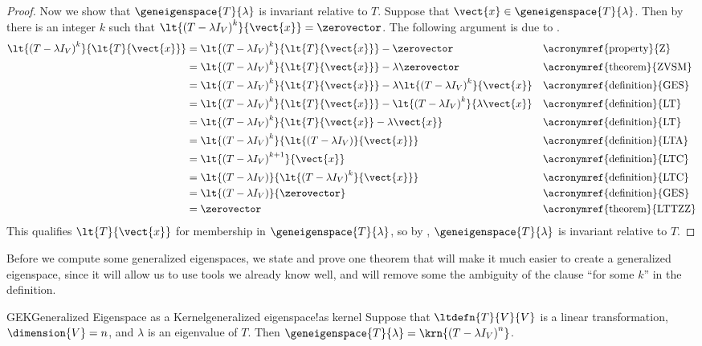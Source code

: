 \begin{proof}
%
Now we show that $\geneigenspace{T}{\lambda}$ is invariant relative to $T$.  Suppose that $\vect{x}\in\geneigenspace{T}{\lambda}$.  Then by  there is an integer $k$ such that $\lt{\left(T-\lambda I_V\right)^k}{\vect{x}}=\zerovector$.  The following argument is due to \zoltantoth.
%
\begin{align*}
\lt{\left(T-\lambda I_V\right)^k}{\lt{T}{\vect{x}}}
%
&=\lt{\left(T-\lambda I_V\right)^k}{\lt{T}{\vect{x}}} - \zerovector
&&\text{\acronymref{property}{Z}}\\
%
&=\lt{\left(T-\lambda I_V\right)^k}{\lt{T}{\vect{x}}} - \lambda\zerovector
&&\text{\acronymref{theorem}{ZVSM}}\\
%
&=\lt{\left(T-\lambda I_V\right)^k}{\lt{T}{\vect{x}}} 
- \lambda\lt{\left(T-\lambda I_V\right)^k}{\vect{x}}
&&\text{\acronymref{definition}{GES}}\\
%
&=\lt{\left(T-\lambda I_V\right)^k}{\lt{T}{\vect{x}}} 
- \lt{\left(T-\lambda I_V\right)^k}{\lambda\vect{x}}
&&\text{\acronymref{definition}{LT}}\\
%
&=\lt{\left(T-\lambda I_V\right)^k}{\lt{T}{\vect{x}}-\lambda\vect{x}} 
&&\text{\acronymref{definition}{LT}}\\
%
&=\lt{\left(T-\lambda I_V\right)^k}{\lt{\left(T-\lambda I_V\right)}{\vect{x}}} 
&&\text{\acronymref{definition}{LTA}}\\
%
&=\lt{\left(T-\lambda I_V\right)^{k+1}}{\vect{x}} 
&&\text{\acronymref{definition}{LTC}}\\
%
&=\lt{\left(T-\lambda I_V\right)}{\lt{\left(T-\lambda I_V\right)^k}{\vect{x}}} 
&&\text{\acronymref{definition}{LTC}}\\
%
&=\lt{\left(T-\lambda I_V\right)}{\zerovector} 
&&\text{\acronymref{definition}{GES}}\\
%
&=\zerovector 
&&\text{\acronymref{theorem}{LTTZZ}}
\end{align*}
%
This qualifies $\lt{T}{\vect{x}}$ for membership in $\geneigenspace{T}{\lambda}$, so by , $\geneigenspace{T}{\lambda}$ is invariant relative to $T$.
\end{proof}
%
Before we compute some generalized eigenspaces, we state and prove one theorem that will make it much easier to create a generalized eigenspace, since it will allow us to use tools we already know well, and will remove some the ambiguity of the clause ``for some $k$'' in the definition.
%
%
\begin{theorem}{GEK}{Generalized Eigenspace as a Kernel}{generalized eigenspace!as kernel}
Suppose that $\ltdefn{T}{V}{V}$ is a linear transformation, $\dimension{V}=n$, and $\lambda$ is an eigenvalue of $T$.  Then $\geneigenspace{T}{\lambda}=\krn{\left(T-\lambda I_V\right)^n}$.
\end{theorem}
